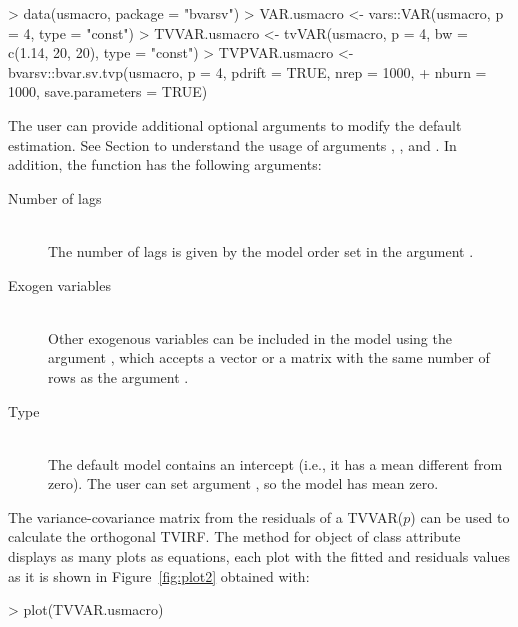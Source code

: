 \begin{Schunk}
\begin{Sinput}
> data(usmacro, package = "bvarsv")
> VAR.usmacro <- vars::VAR(usmacro, p = 4, type = "const")
> TVVAR.usmacro <- tvVAR(usmacro, p = 4, bw = c(1.14, 20, 20), type = "const")
> TVPVAR.usmacro <- bvarsv::bvar.sv.tvp(usmacro, p = 4, pdrift = TRUE, nrep = 1000,  
+                                       nburn = 1000, save.parameters = TRUE)
\end{Sinput}
\end{Schunk}

The user can provide additional optional arguments to modify the default estimation. See Section  to understand the usage of arguments ,   ,    and  . In addition, the function  has the following arguments:

\begin{description}
\item[Number of lags] \hfill\\
The number of lags is given by the model order set in  the argument .
\item[Exogen variables] \hfill\\
Other exogenous variables can be included in the model using the argument , which accepts a vector or a matrix with the same number of rows as the argument .
\item[Type] \hfill\\
The default model contains an intercept (i.e., it has a mean different from zero). The user can set argument , so the model has mean zero.
\end{description}

The variance-covariance matrix from the residuals of a TVVAR($p$) can be used to calculate the orthogonal TVIRF. The  method for object of class attribute  displays as many plots as equations, each plot with the fitted and residuals values as it is shown in Figure~\ref{fig:plot2} obtained with:

\begin{Schunk}
\begin{Sinput}
> plot(TVVAR.usmacro)
\end{Sinput}
\end{Schunk}

